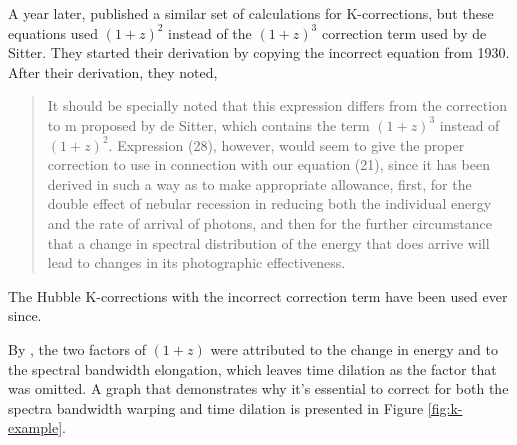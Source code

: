 \documentclass{article}
\begin{document}
A year later, \citet{hubble1935} published a similar set of calculations for
K-corrections, but these equations used $(1 + z)^2$ instead of the $(1 + z)^3$
correction term used by de Sitter. They started their derivation by copying the
incorrect equation from 1930. After their derivation, they noted,

\begin{quote}
It should be specially noted that this expression differs from the correction
to m proposed by de Sitter, which contains the term $(1 + z)^3$ instead of
$(1 + z)^2$. Expression (28), however, would seem to give the proper correction
to use in connection with our equation (21), since it has been derived in such
a way as to make appropriate allowance, first, for the double effect of nebular
recession in reducing both the individual energy and the rate of arrival of
photons, and then for the further circumstance that a change in spectral
distribution of the energy that does arrive will lead to changes in its
photographic effectiveness.
\end{quote}

The Hubble K-corrections with the incorrect correction term have been used ever
since.

By \citet{oke1968}, the two factors of $(1 + z)$ were attributed to the change
in energy and to the spectral bandwidth elongation, which leaves time dilation
as the factor that was omitted. A graph that demonstrates why it's essential to
correct for both the spectra bandwidth warping and time dilation is presented
in Figure \ref{fig:k-example}.
\end{document}
